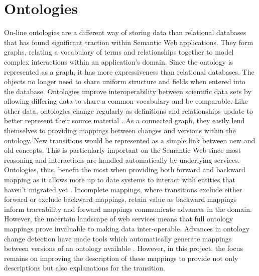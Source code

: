 \section{Ontologies}

On-line ontologies are a different way of storing data than relational databases that has found significant traction within Semantic Web applications.
They form graphs, relating a vocabulary of terms and relationships together to model complex interactions within an application's domain.
Since the ontology is represented as a graph, it has more expressiveness than relational databases.
The objects no longer need to share uniform structure and fields when entered into the database.
Ontologies improve interoperability between scientific data sets by allowing differing data to share a common vocabulary and be comparable.
Like other data, ontologies change regularly as definitions and relationships update to better represent their source material \cite{Ochs:2015:SVS:2826733.2826866}.
As a connected graph, they easily lend themselves to providing mappings between changes and versions within the ontology.
New transitions would be represented as a simple link between new and old concepts.
This is particularly important on the Semantic Web since most reasoning and interactions are handled automatically by underlying services.
Ontologies, thus, benefit the most when providing both forward and backward mapping as it allows more up to date systems to interact with entities that haven't migrated yet \cite{Klein01ontologyversioning}.
Incomplete mappings, where transitions exclude either forward or exclude backward mappings, retain value as backward mappings inform traceability and forward mappings communicate advances in the domain.
However, the uncertain landscape of web services means that full ontology mappings prove invaluable to making data inter-operable.
Advances in ontology change detection have made tools which automatically generate mappings between versions of an ontology available \cite{Hartung201315}.
However, in this project, the focus remains on improving the description of these mappings to provide not only descriptions but also explanations for the transition.


